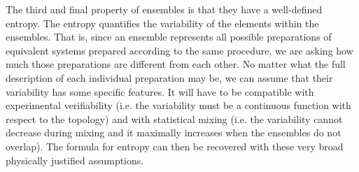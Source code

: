 The third and final property of ensembles is that they have a well-defined entropy. The entropy quantifies the variability of the elements within the ensembles. That is, since an ensemble represents all possible preparations of equivalent systems prepared according to the same procedure, we are asking how much those preparations are different from each other. No matter what the full description of each individual preparation may be, we can assume that their variability has some specific features. It will have to be compatible with experimental verifiability (i.e. the variability must be a continuous function with respect to the topology) and with statistical mixing (i.e. the variability cannot decrease during mixing and it maximally increases when the ensembles do not overlap). The formula for entropy can then be recovered with these very broad physically justified assumptions.


